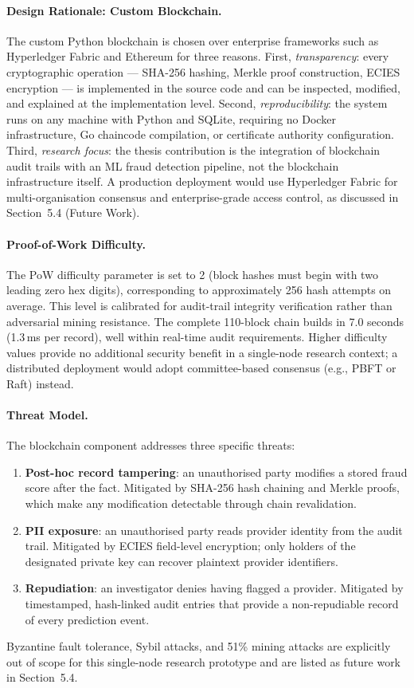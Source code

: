 \begin{enumerate}[label=\roman*.]
\paragraph{Design Rationale: Custom Blockchain.}
The custom Python blockchain is chosen over enterprise frameworks such as Hyperledger Fabric and Ethereum for three reasons. First, \emph{transparency}: every cryptographic operation --- SHA-256 hashing, Merkle proof construction, ECIES encryption --- is implemented in the source code and can be inspected, modified, and explained at the implementation level. Second, \emph{reproducibility}: the system runs on any machine with Python and SQLite, requiring no Docker infrastructure, Go chaincode compilation, or certificate authority configuration. Third, \emph{research focus}: the thesis contribution is the integration of blockchain audit trails with an ML fraud detection pipeline, not the blockchain infrastructure itself. A production deployment would use Hyperledger Fabric for multi-organisation consensus and enterprise-grade access control, as discussed in Section~5.4 (Future Work).

\paragraph{Proof-of-Work Difficulty.}
The PoW difficulty parameter is set to 2 (block hashes must begin with two leading zero hex digits), corresponding to approximately 256 hash attempts on average. This level is calibrated for audit-trail integrity verification rather than adversarial mining resistance. The complete 110-block chain builds in 7.0 seconds (1.3\,ms per record), well within real-time audit requirements. Higher difficulty values provide no additional security benefit in a single-node research context; a distributed deployment would adopt committee-based consensus (e.g., PBFT or Raft) instead.

\paragraph{Threat Model.}
The blockchain component addresses three specific threats:
\begin{enumerate}[nosep]
\item \textbf{Post-hoc record tampering}: an unauthorised party modifies a stored fraud score after the fact. Mitigated by SHA-256 hash chaining and Merkle proofs, which make any modification detectable through chain revalidation.
\item \textbf{PII exposure}: an unauthorised party reads provider identity from the audit trail. Mitigated by ECIES field-level encryption; only holders of the designated private key can recover plaintext provider identifiers.
\item \textbf{Repudiation}: an investigator denies having flagged a provider. Mitigated by timestamped, hash-linked audit entries that provide a non-repudiable record of every prediction event.
\end{enumerate}
Byzantine fault tolerance, Sybil attacks, and 51\% mining attacks are explicitly out of scope for this single-node research prototype and are listed as future work in Section~5.4.


\end{enumerate}
